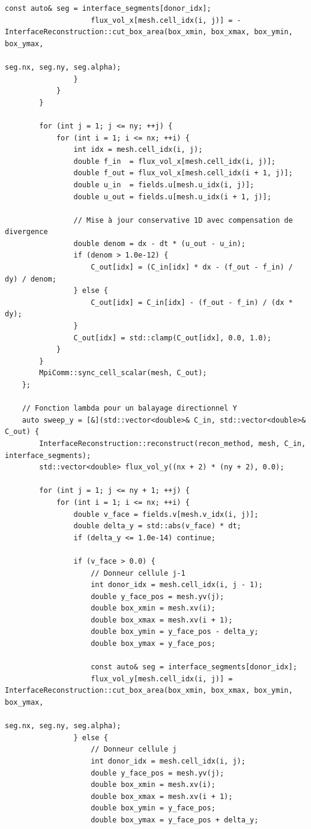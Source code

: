 \documentclass[10pt,a4paper,oneside]{book}
\begin{document}
\begin{lstlisting}[language={[11]C++}]
                    const auto& seg = interface_segments[donor_idx];
                    flux_vol_x[mesh.cell_idx(i, j)] = -InterfaceReconstruction::cut_box_area(box_xmin, box_xmax, box_ymin, box_ymax,
                                                                                            seg.nx, seg.ny, seg.alpha);
                }
            }
        }

        for (int j = 1; j <= ny; ++j) {
            for (int i = 1; i <= nx; ++i) {
                int idx = mesh.cell_idx(i, j);
                double f_in  = flux_vol_x[mesh.cell_idx(i, j)];
                double f_out = flux_vol_x[mesh.cell_idx(i + 1, j)];
                double u_in  = fields.u[mesh.u_idx(i, j)];
                double u_out = fields.u[mesh.u_idx(i + 1, j)];

                // Mise à jour conservative 1D avec compensation de divergence
                double denom = dx - dt * (u_out - u_in);
                if (denom > 1.0e-12) {
                    C_out[idx] = (C_in[idx] * dx - (f_out - f_in) / dy) / denom;
                } else {
                    C_out[idx] = C_in[idx] - (f_out - f_in) / (dx * dy);
                }
                C_out[idx] = std::clamp(C_out[idx], 0.0, 1.0);
            }
        }
        MpiComm::sync_cell_scalar(mesh, C_out);
    };

    // Fonction lambda pour un balayage directionnel Y
    auto sweep_y = [&](std::vector<double>& C_in, std::vector<double>& C_out) {
        InterfaceReconstruction::reconstruct(recon_method, mesh, C_in, interface_segments);
        std::vector<double> flux_vol_y((nx + 2) * (ny + 2), 0.0);

        for (int j = 1; j <= ny + 1; ++j) {
            for (int i = 1; i <= nx; ++i) {
                double v_face = fields.v[mesh.v_idx(i, j)];
                double delta_y = std::abs(v_face) * dt;
                if (delta_y <= 1.0e-14) continue;

                if (v_face > 0.0) {
                    // Donneur cellule j-1
                    int donor_idx = mesh.cell_idx(i, j - 1);
                    double y_face_pos = mesh.yv(j);
                    double box_xmin = mesh.xv(i);
                    double box_xmax = mesh.xv(i + 1);
                    double box_ymin = y_face_pos - delta_y;
                    double box_ymax = y_face_pos;

                    const auto& seg = interface_segments[donor_idx];
                    flux_vol_y[mesh.cell_idx(i, j)] = InterfaceReconstruction::cut_box_area(box_xmin, box_xmax, box_ymin, box_ymax,
                                                                                           seg.nx, seg.ny, seg.alpha);
                } else {
                    // Donneur cellule j
                    int donor_idx = mesh.cell_idx(i, j);
                    double y_face_pos = mesh.yv(j);
                    double box_xmin = mesh.xv(i);
                    double box_xmax = mesh.xv(i + 1);
                    double box_ymin = y_face_pos;
                    double box_ymax = y_face_pos + delta_y;


\end{lstlisting}
\end{document}
